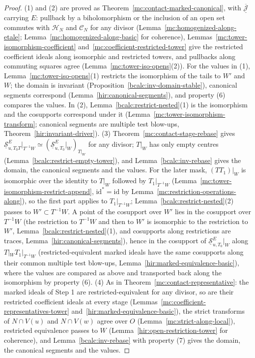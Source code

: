 \begin{proof}
\leanok
(1) and (2) are proved as Theorem~\ref{mc:contact-marked-canonical}, with \(\overline{\underline{\mathcal J}}\) carrying \(E\): pullback by a biholomorphism or the inclusion of
an open set commutes with \(\mathcal H_N\) and \(\mathcal C_N\) for any divisor (Lemma~\ref{mc:homogenized-along-etale}; Lemma~\ref{mc:homogenized-along-basic} for coherence),
Lemmas~\ref{mc:tower-isomorphism-coefficient} and~\ref{mc:coefficient-restricted-tower} give the restricted coefficient ideals along isomorphic and restricted towers, and
pullbacks along commuting squares agree (Lemma~\ref{mc:tower-iso-opens}(2)). For the values in (1), Lemma~\ref{mc:tower-iso-opens}(1) restricts the isomorphism of the
tails to \(W'\) and \(W\); the domain is invariant (Proposition~\ref{bcalc:inv-domain-stable}), canonical segments correspond (Lemma~\ref{hir:canonical-segments}), and property (6)
compares the values. In (2), Lemma~\ref{bcalc:restrict-nested}(1) is the isomorphism and the cosupports correspond under it (Lemma~\ref{mc:tower-isomorphism-transform}; canonical
segments are multiple test blow-ups, Theorem~\ref{hir:invariant-driver}).
(3) Theorem~\ref{mc:contact-stage-rebase} gives \(\underline{\mathcal S}^E_{u,T_0T}|_{T^{-1}W}\simeq(\underline{\mathcal S}^E_{u,T_0}|_W)_{T|_W}\) for any divisor; \(T|_W\) has only empty
centres (Lemma~\ref{bcalc:restrict-empty-tower}), and Lemma~\ref{bcalc:inv-rebase} gives the domain, the canonical segments and the values. For the later mask, \((TT_1)|_W\) is
isomorphic over the identity to \(T|_W\) followed by \(T_1|_{T^{-1}W}\) (Lemma~\ref{mc:tower-isomorphism-restrict-append}, \(\mathrm{id}^*=\mathrm{id}\) by
Lemma~\ref{mc:restriction-operations-along}), so the first part applies to \(T_1|_{T^{-1}W}\); Lemma~\ref{bcalc:restrict-nested}(2) passes to \(W'\subset T^{-1}W\). A point of the
cosupport over \(W'\) lies in the cosupport over \(T^{-1}W\) (the restriction to \(T^{-1}W\) and then to \(W'\) is isomorphic to the restriction to \(W'\),
Lemma~\ref{bcalc:restrict-nested}(1), and cosupports along restrictions are traces, Lemma~\ref{hir:canonical-segments}), hence in the cosupport of
\(\underline{\mathcal S}^E_{u,T_0}|_W\) along \(T|_WT_1|_{T^{-1}W}\) (restricted-equivalent marked ideals have the same cosupports along their common multiple test blow-ups,
Lemma~\ref{hir:marked-equivalence-basic}), where the values are compared as above and transported back along the isomorphism by property (6).
(4) As in Theorem~\ref{mc:contact-representative}: the marked ideals of Step 1 are restricted-equivalent for any divisor, so are their restricted coefficient ideals at every
stage (Lemmas~\ref{mc:coefficient-representatives-tower} and~\ref{hir:marked-equivalence-basic}), the strict transforms of \(N\cap V(u)\) and \(N\cap V(w)\) agree over \(O\)
(Lemma~\ref{mc:strict-along-local}), restricted equivalence passes to \(W\) (Lemma~\ref{hir:open-restriction-tower} for coherence), and Lemma~\ref{bcalc:inv-rebase} with property (7)
gives the domain, the canonical segments and the values.
\end{proof}
